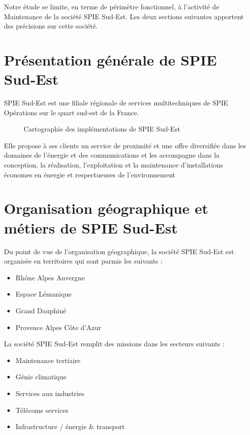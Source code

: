 
Notre étude se limite, en terme de périmètre fonctionnel, à l'activité de Maintenance de la société SPIE Sud-Est. Les deux sections suivantes apportent des précisions sur cette société.

\section{Présentation générale de SPIE Sud-Est}

SPIE Sud-Est est une filiale régionale de services multitechniques de SPIE Opérations sur le quart sud-est de la France.

\begin{figure}[H]
    \label{fig-implem-spie}
    \noindent{}
    \caption{Cartographie des implémentations de SPIE Sud-Est}
\end{figure}

Elle propose à ses clients un service de proximité et une offre diversifiée dans les domaines de l'énergie et des communications et les accompagne dans la conception, la réalisation, l’exploitation et la maintenance d’installations économes en énergie et respectueuses de l’environnement

\section{Organisation géographique et métiers de SPIE Sud-Est}

Du point de vue de l'organisation géographique, la société SPIE Sud-Est est organisée en territoires qui sont parmis les suivants : \\
\begin{itemize}
    \item[\textbullet] Rhône Alpes Auvergne
    \item[\textbullet] Espace Lémanique
    \item[\textbullet] Grand Dauphiné
    \item[\textbullet] Provence Alpes Côte d'Azur\\
\end{itemize}
    
La société SPIE Sud-Est remplit des missions dans les secteurs suivants :  \\
\begin{itemize}
    \item[\textbullet] Maintenance tertiaire
    \item[\textbullet] Génie climatique
    \item[\textbullet] Services aux industries
    \item[\textbullet] Télécoms services
    \item[\textbullet] Infrastructure / énergie \& transport
\end{itemize}